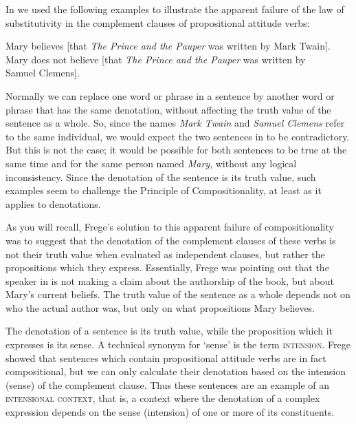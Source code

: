In  we used the following examples to illustrate the apparent failure of the law of substitutivity in the complement clauses of propositional attitude verbs:


\ea
\ea Mary believes [that \textit{The Prince and the Pauper} was written by Mark Twain].\\
\ex Mary does not believe [that \textit{The Prince and the Pauper} was written by\\
  Samuel Clemens].
                       \z
\z


Normally we can replace one word or phrase in a sentence by another word or phrase that has the same denotation, without affecting the truth value of the sentence as a whole. So, since the names \textit{Mark Twain} and \textit{Samuel Clemens} refer to the same individual, we would expect the two sentences in  to be contradictory. But this is not the case; it would be possible for both sentences to be true at the same time and for the same person named \textit{Mary}, without any logical inconsistency. Since the denotation of the sentence is its truth value, such examples seem to challenge the Principle of Compositionality, at least as it applies to denotations.



As you will recall, Frege’s solution to this apparent failure of compositionality was to suggest that the denotation of the complement clauses of these verbs is not their truth value when evaluated as independent clauses, but rather the propositions which they express. Essentially, Frege was pointing out that the speaker in  is not making a claim about the authorship of the book, but about Mary’s current beliefs. The truth value of the sentence as a whole depends not on who the actual author was, but only on what propositions Mary believes.



The denotation of a sentence is its truth value, while the proposition which it expresses is its sense. A technical synonym for ‘sense’ is the term \textsc{intension}. Frege showed that sentences which contain propositional attitude verbs are in fact compositional, but we can only calculate their denotation based on the intension (sense) of the complement clause. Thus these sentences are an example of an \textsc{intensional context}, that is, a context where the denotation of a complex expression depends on the sense (intension) of one or more of its constituents.



